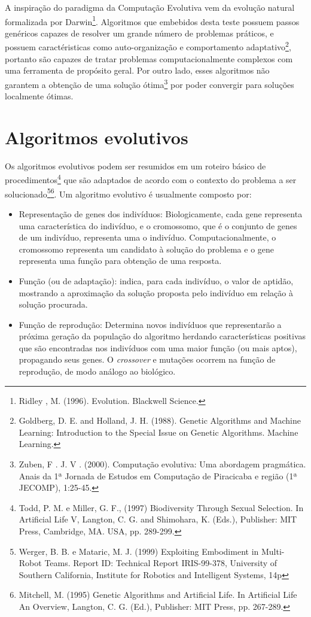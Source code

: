 A inspiração do paradigma da Computação Evolutiva vem da evolução natural formalizada por Darwin\footnote
{Ridley , M. (1996). Evolution. Blackwell Science.}.
Algoritmos que embebidos desta teste possuem passos genéricos capazes de resolver um grande número de problemas práticos, e possuem caractéristicas como auto-organização e comportamento adaptativo\footnote
{Goldberg, D. E. and Holland, J. H. (1988). Genetic Algorithms and Machine Learning: Introduction to the Special Issue on Genetic Algorithms. Machine Learning.},
portanto são capazes de tratar problemas computacionalmente complexos com uma ferramenta de propósito geral. Por outro lado, esses algoritmos não garantem a obtenção de uma solução ótima\footnote
{Zuben, F . J. V . (2000). Computação evolutiva: Uma abordagem pragmática. Anais da 1ª Jornada de Estudos em Computação de Piracicaba e região (1ª JECOMP), 1:25-45.}
por poder convergir para soluções localmente ótimas.

\section{Algoritmos evolutivos}
Os algoritmos evolutivos podem ser resumidos em um roteiro básico de procedimentos\footnote
{Todd, P. M. e Miller, G. F., (1997) Biodiversity Through Sexual Selection. In Artificial Life V, Langton, C. G. and Shimohara, K. (Eds.), Publisher: MIT Press, Cambridge, MA. USA, pp. 289-299.}
que são adaptados de acordo com o contexto do problema a ser solucionado\footnote
{Werger, B. B. e Mataric, M. J. (1999) Exploiting Embodiment in Multi-Robot Teams. Report ID: Technical Report IRIS-99-378, University of Southern California, Institute for Robotics and Intelligent Systems, 14p}\footnote
{Mitchell, M. (1995) Genetic Algorithms and Artificial Life. In Artificial Life An Overview, Langton, C. G. (Ed.), Publisher: MIT Press, pp. 267-289.}.
Um algoritmo evolutivo é usualmente composto por:

\newcommand{\crossover}{\textit{crossover}\xspace}

\begin{itemize}
    \item Representação de genes dos indivíduos: Biologicamente, cada gene representa uma característica do indivíduo, e o cromossomo, que é o conjunto de genes de um indivíduo, representa uma o indivíduo. Computacionalmente, o cromossomo representa um candidato à solução do problema e o gene representa uma função para obtenção de uma resposta.
    \item Função \fitness (ou de adaptação): indica, para cada indivíduo, o valor de aptidão, mostrando a aproximação da solução proposta pelo indivíduo em relação à solução procurada.
    \item Função de reprodução: Determina novos indivíduos que representarão a próxima geração da população do algoritmo herdando características positivas que são encontradas nos indivíduos com uma maior função \fitness (ou mais aptos), propagando seus genes. O \crossover e mutações ocorrem na função de reprodução, de modo análogo ao biológico.
\end{itemize}

